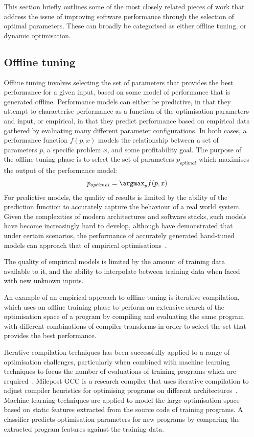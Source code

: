 This section briefly outlines some of the most closely related pieces
of work that address the issue of improving software performance
through the selection of optimal parameters. These can broadly be
categorised as either offline tuning, or dynamic optimisation.

\subsection{Offline tuning}\label{subsec:offline-tuning}
Offline tuning involves selecting the set of parameters that provides
the best performance for a given input, based on some model of
performance that is generated offline. Performance models can either
be predictive, in that they attempt to characterise performance as a
function of the optimisation parameters and input, or empirical, in
that they predict performance based on empirical data gathered by
evaluating many different parameter configurations. In both cases, a
performance function $f(p,x)$ models the relationship between a set of
parameters $p$, a specific problem $x$, and some profitability
goal. The purpose of the offline tuning phase is to select the set of
parameters $p_{optimal}$ which maximises the output of the performance
model:
\begin{align*}
  p_{optimal} = \argmax_{p}f(p,x)
\end{align*}
For predictive models, the quality of results is limited by the
ability of the prediction function to accurately capture the behaviour
of a real world system. Given the complexities of modern architectures
and software stacks, such models have become increasingly hard to
develop, although \citeauthor{Yotov2003} have demonstrated that under
certain scenarios, the performance of accurately generated hand-tuned
models can approach that of empirical optimisations~\cite{Yotov2003}.

The quality of empirical models is limited by the amount of training
data available to it, and the ability to interpolate between training
data when faced with new unknown inputs.

An example of an empirical approach to offline tuning is iterative
compilation, which uses an offline training phase to perform an
extensive search of the optimisation space of a program by compiling
and evaluating the same program with different combinations of
compiler transforms in order to select the set that provides the best
performance.

Iterative compilation techniques has been successfully applied to a
range of optimisation challenges, particularly when combined with
machine learning techniques to focus the number of evaluations of
training programs which are required~\cite{Agakov}. Milepost GCC is a
research compiler that uses iterative compilation to adjust compiler
heuristics for optimising programs on different
architectures~\cite{Fursin2011}. Machine learning techniques are
applied to model the large optimisation space based on static features
extracted from the source code of training programs. A classifier
predicts optimisation parameters for new programs by comparing the
extracted program features against the training data.

